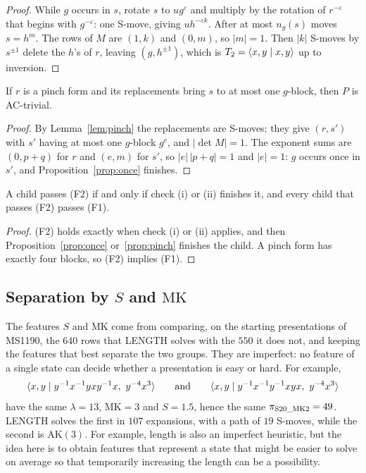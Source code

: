 \begin{proof}
While $g$ occurs in $s$, rotate $s$ to $ug^{\varepsilon}$ and multiply by the rotation of $r^{-\varepsilon}$ that begins
with $g^{-\varepsilon}$: one S-move, giving $uh^{-\varepsilon k}$. After at most $n_g(s)$ moves $s=h^m$. The rows of
$M$ are $(1,k)$ and $(0,m)$, so $|m|=1$. Then $|k|$ S-moves by $s^{\pm1}$ delete the $h$'s of $r$, leaving
$(g,h^{\pm1})$, which is $T_2=\langle x,y \mid x,y \rangle$ up to inversion.
\end{proof}

\begin{proposition}\label{prop:pinch}
If $r$ is a pinch form and its replacements bring $s$ to at most one $g$-block, then $P$ is AC-trivial.
\end{proposition}

\begin{proof}
By Lemma~\ref{lem:pinch} the replacements are S-moves; they give $(r,s')$ with $s'$ having at most one $g$-block
$g^e$, and $|\det M|=1$. The exponent sums are $(0,p+q)$ for $r$ and $(e,m)$ for $s'$, so $|e|\,|p+q|=1$ and $|e|=1$:
$g$ occurs once in $s'$, and Proposition~\ref{prop:once} finishes.
\end{proof}

\begin{proposition}\label{prop:filters}
A child passes (F2) if and only if check (i) or (ii) finishes it, and every child that passes (F2) passes (F1).
\end{proposition}

\begin{proof}
(F2) holds exactly when check (i) or (ii) applies, and then Proposition~\ref{prop:once} or~\ref{prop:pinch} finishes
the child. A pinch form has exactly four blocks, so (F2) implies (F1).
\end{proof}

\subsection{Separation by $S$ and $\mathrm{MK}$}\label{app:smk}

\begin{remark}
The features $S$ and $\mathrm{MK}$ come from comparing, on the starting presentations of MS1190, the $640$ rows that
LENGTH solves with the $550$ it does not, and keeping the features that best separate the two groups. They are
imperfect: no feature of a single state can decide whether a presentation is easy or hard. For example,
\[
\langle x,y \mid y^{-1}x^{-1}yxy^{-1}x,\ y^{-4}x^3 \rangle
\qquad\text{and}\qquad
\langle x,y \mid y^{-1}x^{-1}y^{-1}xyx,\ y^{-4}x^3 \rangle
\]
have the same $\lambda=13$, $\mathrm{MK}=3$ and $S=1.5$, hence the same $\pi_{\mathrm{S20\_MK2}}=49$. LENGTH solves the first in
$107$ expansions, with a path of $19$ S-moves, while the second is $\mathrm{AK}(3)$. For example, length is also an imperfect heuristic, but the idea here is to obtain features that represent a state that might be easier to solve on average so that temporarily increasing the length can be a possibility.
\end{remark}

